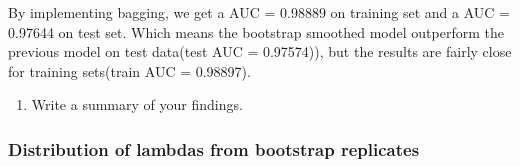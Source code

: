 \documentclass[
]{article}
\newenvironment{Shaded}{\begin{snugshade}}{\end{snugshade}}
\newcommand{\ConstantTok}[1]{\textcolor[rgb]{0.56,0.35,0.01}{#1}}
\newcommand{\DecValTok}[1]{\textcolor[rgb]{0.00,0.00,0.81}{#1}}
\newcommand{\FunctionTok}[1]{\textcolor[rgb]{0.13,0.29,0.53}{\textbf{#1}}}
\newcommand{\NormalTok}[1]{#1}
\newcommand{\OtherTok}[1]{\textcolor[rgb]{0.56,0.35,0.01}{#1}}
\newcommand{\SpecialCharTok}[1]{\textcolor[rgb]{0.81,0.36,0.00}{\textbf{#1}}}
\newcommand{\StringTok}[1]{\textcolor[rgb]{0.31,0.60,0.02}{#1}}
\providecommand{\tightlist}{%
  \setlength{\itemsep}{0pt}\setlength{\parskip}{0pt}}
\begin{document}
\begin{Shaded}
\end{Shaded}

By implementing bagging, we get a AUC = 0.98889 on training set and a
AUC = 0.97644 on test set. Which means the bootstrap smoothed model
outperform the previous model on test data(test AUC = 0.97574)), but the
results are fairly close for training sets(train AUC = 0.98897).

\begin{enumerate}
\def\labelenumi{\arabic{enumi}.}
\setcounter{enumi}{3}
\tightlist
\item
  Write a summary of your findings.
\end{enumerate}

\hypertarget{distribution-of-lambdas-from-bootstrap-replicates}{%
\subsubsection{Distribution of lambdas from bootstrap
replicates}\label{distribution-of-lambdas-from-bootstrap-replicates}}
\end{document}
